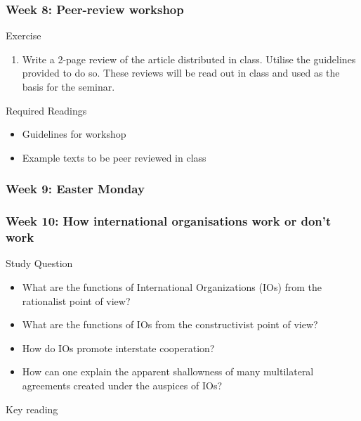 \documentclass[12pt,a4paper]{article}
\begin{document}
\subsubsection*{Week 8: Peer-review workshop}

Exercise

\begin{enumerate}
	\item Write a 2-page review of the article distributed in class. Utilise the guidelines provided to do so. These reviews will be read out in class and used as the basis for the seminar.
\end{enumerate}

\noindent Required Readings

\begin{itemize}
	\item Guidelines for workshop
	\item Example texts to be peer reviewed in class
\end{itemize}

\subsubsection*{Week 9: Easter Monday}

\subsubsection*{Week 10: How international organisations work or don't work}

Study Question

\begin{itemize}
	\item What are the functions of International Organizations (IOs) from the rationalist point of view?
	\item What are the functions of IOs from the constructivist point of view?
	\item How do IOs promote interstate cooperation?
	\item How can one explain the apparent shallowness of many multilateral agreements created under the auspices of IOs?
\end{itemize}

\noindent Key reading
\end{document}
